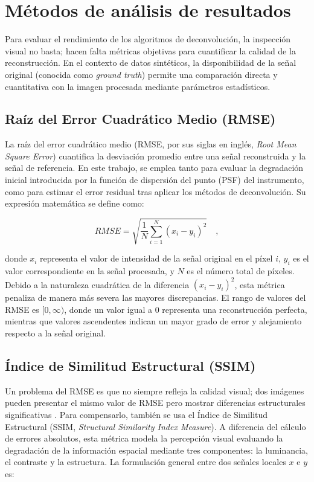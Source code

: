 
\section{Métodos de análisis de resultados}
Para evaluar el rendimiento de los algoritmos de deconvolución, la inspección visual no basta; hacen falta métricas objetivas para cuantificar la calidad de la reconstrucción. En el contexto de datos sintéticos, la disponibilidad de la señal original (conocida como \textit{ground truth}) permite una comparación directa y cuantitativa con la imagen procesada mediante parámetros estadísticos.

\subsection{Raíz del Error Cuadrático Medio (RMSE)}
La raíz del error cuadrático medio (RMSE, por sus siglas en inglés, \textit{Root Mean Square Error}) cuantifica la desviación promedio entre una señal reconstruida y la señal de referencia. En este trabajo, se emplea tanto para evaluar la degradación inicial introducida por la función de dispersión del punto (PSF) del instrumento, como para estimar el error residual tras aplicar los métodos de deconvolución. Su expresión matemática se define como:

\begin{equation}
    \label{eq:RMSE}
    RMSE = \sqrt{\frac{1}{N}\sum_{i=1}^{N}(x_i - y_i)^2} \quad,
\end{equation}

donde $x_i$ representa el valor de intensidad de la señal original en el píxel $i$, $y_i$ es el valor correspondiente en la señal procesada, y $N$ es el número total de píxeles. Debido a la naturaleza cuadrática de la diferencia $(x_i - y_i)^2$, esta métrica penaliza de manera más severa las mayores discrepancias. El rango de valores del RMSE es $[0, \infty)$, donde un valor igual a $0$ representa una reconstrucción perfecta, mientras que valores ascendentes indican un mayor grado de error y alejamiento respecto a la señal original.

\subsection{Índice de Similitud Estructural (SSIM)}
Un problema del RMSE es que no siempre refleja la calidad visual; dos imágenes pueden presentar el mismo valor de RMSE pero mostrar diferencias estructurales significativas \cite{Wang2004}. Para compensarlo, también se usa el Índice de Similitud Estructural (SSIM, \textit{Structural Similarity Index Measure}). A diferencia del cálculo de errores absolutos, esta métrica modela la percepción visual evaluando la degradación de la información espacial mediante tres componentes: la luminancia, el contraste y la estructura. La formulación general entre dos señales locales $x$ e $y$ es:


